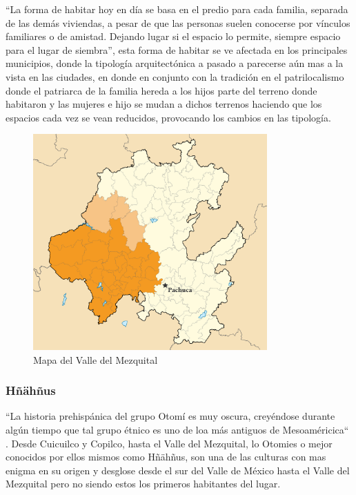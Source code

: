 ``La forma de habitar hoy en día se basa en el predio para cada familia, separada de las demás viviendas, a pesar de que las personas suelen conocerse por vínculos familiares o de amistad. Dejando lugar si el espacio lo permite, siempre espacio para el lugar de siembra''\citep{GuerreroGuerrero1983}, esta forma de habitar se ve afectada en los principales municipios, donde la tipología arquitectónica a pasado a parecerse aún mas a la vista en las ciudades, en donde en conjunto con la tradición en el patrilocalismo donde el patriarca de la familia hereda a los hijos parte del terreno donde habitaron y las mujeres e hijo se mudan a dichos terrenos haciendo que los espacios cada vez se vean reducidos, provocando los cambios en las tipología.

\begin{figure}[ht]
    \center
    \includegraphics[width=0.8\textwidth]{../../imagenes/Mapa_Valle_del_Mezquital.svg}
    \caption{Mapa del Valle del Mezquital}
\end{figure}

\subsubsection{Hñähñus}
``La historia prehispánica del grupo Otomí es muy oscura, creyéndose durante algún tiempo que tal grupo étnico es uno de loa más antiguos de Mesoaméricica`` \cite[67]{GuerreroGuerrero1983}. Desde Cuicuilco y Copilco, hasta el Valle del Mezquital, lo Otomies o mejor conocidos por ellos mismos como Hñähñus, son una de las culturas con mas enigma en su origen y desglose desde el sur del Valle de México hasta el Valle del Mezquital pero no siendo estos los primeros habitantes del lugar.

